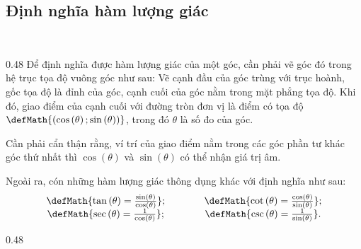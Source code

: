 \subsection{Định nghĩa hàm lượng giác}

\ %

{
   \begin{minipageindent}{0.48\textwidth}
      Để định nghĩa được hàm lượng giác của một góc, cần phải vẽ góc đó trong hệ trục tọa độ vuông góc như sau: Vẽ cạnh đầu của góc trùng với trục hoành, gốc tọa độ là đỉnh của góc, cạnh cuối của góc nằm trong mặt phẳng tọa độ. Khi đó, giao điểm của cạnh cuối với đường tròn đơn vị là điểm có tọa độ $\defMath{\left(\cos \left(\theta\right); \sin \left(\theta\right)\right)}$, trong đó $\theta$ là số đo của góc.

      Cần phải cẩn thận rằng, ví trí của giao điểm nằm trong các góc phần tư khác góc thứ nhất thì $\cos \left(\theta\right)$ và $\sin \left(\theta\right)$ có thể nhận giá trị âm.

      Ngoài ra, cón những hàm lượng giác thông dụng khác với định nghĩa như sau:
      \begin{equation*}
         \begin{array}{ccc}
            \defMath{\tan \left(\theta\right) = \frac{\sin \left(\theta\right)}{\cos \left(\theta\right)}}; &\qquad& \defMath{\cot \left(\theta\right) = \frac{\cos \left(\theta\right)}{\sin \left(\theta\right)}}; \\
            \defMath{\sec \left(\theta\right) = \frac{1}{\cos \left(\theta\right)}}; &\qquad& \defMath{\csc \left(\theta\right) = \frac{1}{\sin \left(\theta\right)}}.
         \end{array}
      \end{equation*}
   \end{minipageindent}
   \hfill
   \begin{minipageindent}{0.48\textwidth}
      \begin{figure}[H]
         \centering
\end{figure}
\end{minipageindent}}
